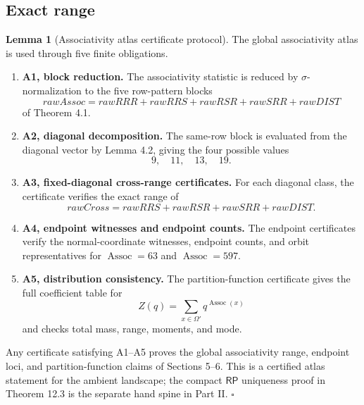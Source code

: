 \documentclass[11pt]{article}
\providecommand{\tightlist}{%
  \setlength{\itemsep}{0pt}\setlength{\parskip}{0pt}}
\theoremstyle{definition}
\newtheorem{lemma}[theorem]{Lemma}
\newcommand{\RP}{\mathsf{RP}}
\begin{document}
\subsection{Exact range}\label{exact-range}

\begin{lemma}[Associativity atlas certificate protocol]
\label{lem:5.1}
The
global associativity atlas is used through five finite obligations.

\begin{enumerate}
\def\labelenumi{\arabic{enumi}.}
\tightlist
\item
  \textbf{A1, block reduction.} The associativity statistic is reduced
  by \(\sigma\)-normalization to the five row-pattern blocks \[
  rawAssoc=rawRRR+rawRRS+rawRSR+rawSRR+rawDIST
  \] of Theorem 4.1.
\item
  \textbf{A2, diagonal decomposition.} The same-row block is evaluated
  from the diagonal vector by Lemma 4.2, giving the four possible values
  \[
  9,\quad 11,\quad 13,\quad 19.
  \]
\item
  \textbf{A3, fixed-diagonal cross-range certificates.} For each
  diagonal class, the certificate verifies the exact range of \[
  rawCross=rawRRS+rawRSR+rawSRR+rawDIST.
  \]
\item
  \textbf{A4, endpoint witnesses and endpoint counts.} The endpoint
  certificates verify the normal-coordinate witnesses, endpoint counts,
  and orbit representatives for \(\operatorname{Assoc}=63\) and
  \(\operatorname{Assoc}=597\).
\item
  \textbf{A5, distribution consistency.} The partition-function
  certificate gives the full coefficient table for \[
  Z(q)=\sum_{x\in\Omega'}q^{\operatorname{Assoc}(x)}
  \] and checks total mass, range, moments, and mode.
\end{enumerate}

Any certificate satisfying A1--A5 proves the global associativity range,
endpoint loci, and partition-function claims of Sections 5--6. This is a
certified atlas statement for the ambient landscape; the compact \(\RP\)
uniqueness proof in Theorem 12.3 is the separate hand spine in Part II.
\hfill$\square$
\end{lemma}
\end{document}
